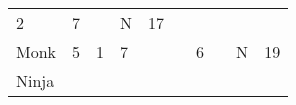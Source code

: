 \documentclass[12pt]{article}
\begin{document}
\begin{longtable}[]{@{}llllllllll@{}}
\begin{minipage}[t]{0.06\columnwidth}\raggedright\strut
2
\strut\end{minipage} &
\begin{minipage}[t]{0.06\columnwidth}\raggedright\strut
7
\strut\end{minipage} &
\begin{minipage}[t]{0.06\columnwidth}\raggedright\strut
\strut\end{minipage} &
\begin{minipage}[t]{0.07\columnwidth}\raggedright\strut
N
\strut\end{minipage} &
\begin{minipage}[t]{0.08\columnwidth}\raggedright\strut
17
\strut\end{minipage}\tabularnewline
\begin{minipage}[t]{0.13\columnwidth}\raggedright\strut
Monk
\strut\end{minipage} &
\begin{minipage}[t]{0.06\columnwidth}\raggedright\strut
5
\strut\end{minipage} &
\begin{minipage}[t]{0.06\columnwidth}\raggedright\strut
1
\strut\end{minipage} &
\begin{minipage}[t]{0.06\columnwidth}\raggedright\strut
7
\strut\end{minipage} &
\begin{minipage}[t]{0.06\columnwidth}\raggedright\strut
\strut\end{minipage} &
\begin{minipage}[t]{0.06\columnwidth}\raggedright\strut
\strut\end{minipage} &
\begin{minipage}[t]{0.06\columnwidth}\raggedright\strut
6
\strut\end{minipage} &
\begin{minipage}[t]{0.06\columnwidth}\raggedright\strut
\strut\end{minipage} &
\begin{minipage}[t]{0.07\columnwidth}\raggedright\strut
N
\strut\end{minipage} &
\begin{minipage}[t]{0.08\columnwidth}\raggedright\strut
19
\strut\end{minipage}\tabularnewline
\begin{minipage}[t]{0.13\columnwidth}\raggedright\strut
Ninja
\strut\end{minipage} &

\end{longtable}
\end{document}
